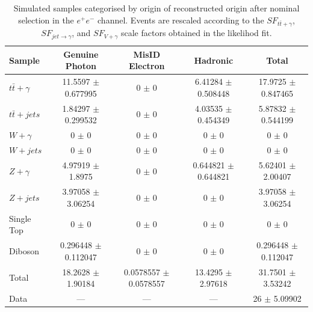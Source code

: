 \begin{table}
\begin{center}
\resizebox{\columnwidth}{!} {
\begin{tabular}{l|ccc|c}
\hline
	\textbf{Sample} & \textbf{Genuine Photon} & \textbf{MisID Electron} & \textbf{Hadronic} & \textbf{Total} \\
\hline
$t\bar{t}+\gamma$  & 11.5597 $\pm$ 0.677995 & 0 $\pm$ 0 & 6.41284 $\pm$ 0.508448 & 17.9725 $\pm$ 0.847465 \\
$t\bar{t}+jets$  & 1.84297 $\pm$ 0.299532 & 0 $\pm$ 0 & 4.03535 $\pm$ 0.454349 & 5.87832 $\pm$ 0.544199 \\
$W+\gamma$  & 0 $\pm$ 0 & 0 $\pm$ 0 & 0 $\pm$ 0 & 0 $\pm$ 0 \\
$W+jets$  & 0 $\pm$ 0 & 0 $\pm$ 0 & 0 $\pm$ 0 & 0 $\pm$ 0 \\
$Z+\gamma$  & 4.97919 $\pm$ 1.8975 & 0 $\pm$ 0 & 0.644821 $\pm$ 0.644821 & 5.62401 $\pm$ 2.00407 \\
$Z+jets$  & 3.97058 $\pm$ 3.06254 & 0 $\pm$ 0 & 0 $\pm$ 0 & 3.97058 $\pm$ 3.06254 \\
Single Top  & 0 $\pm$ 0 & 0 $\pm$ 0 & 0 $\pm$ 0 & 0 $\pm$ 0 \\
Diboson  & 0.296448 $\pm$ 0.112047 & 0 $\pm$ 0 & 0 $\pm$ 0 & 0.296448 $\pm$ 0.112047 \\
\hline
Total  & 18.2628 $\pm$ 1.90184 & 0.0578557 $\pm$ 0.0578557 & 13.4295 $\pm$ 2.97618 & 31.7501 $\pm$ 3.53242 \\
Data  & --- & --- & --- & 26 $\pm$ 5.09902 \\
\hline	
\end{tabular}
}
\end{center}
\caption{Simulated samples categorised by origin of reconstructed origin after nominal selection in the $e^+e^-$ channel. Events are rescaled according to the $SF_{t\bar{t}+\gamma}$, $SF_{jet\to\gamma}$, and $SF_{V+\gamma}$ scale factors obtained in the likelihod fit.}
\label{tab-SigPhotonsEEScaled}
\end{table}	

